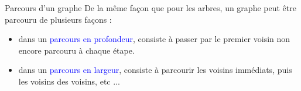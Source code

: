 \documentclass[10pt]{beamer}
\begin{document}
\begin{frame}
	\mframe{\GR}
	\begin{block}{Parcours d'un graphe}
		De la même façon que pour les arbres, un graphe peut être parcouru de plusieurs façons :
		\begin{itemize}
			\item<1-> dans un \textcolor{blue}{parcours en profondeur}, consiste à passer par le premier voisin non encore parcouru à chaque étape.
			\item<2-> dans un \textcolor{blue}{parcours en largeur}, consiste à parcourir les voisins immédiats, puis les voisins des voisins, etc ...
		\end{itemize}
	\end{block}
\end{frame}
\end{document}
